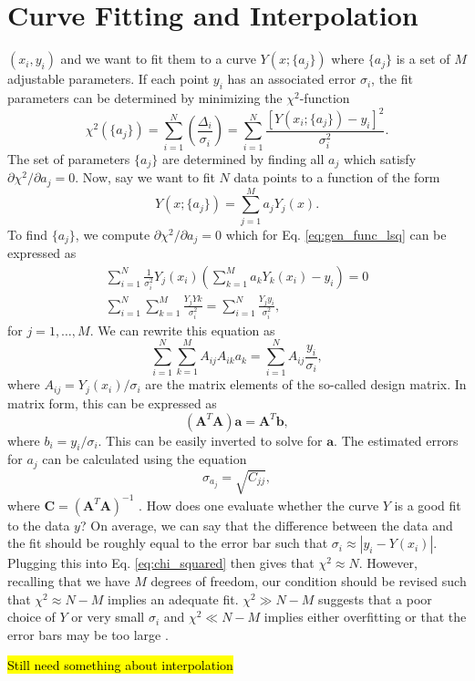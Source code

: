 \section{Curve Fitting and Interpolation}

 $(x_i,y_i)$ and we want to fit them to a curve $Y(x;\{a_j\})$ where $\{a_j\}$ is a set of $M$ adjustable parameters. If each point $y_i$ has an associated error $\sigma_i$, the fit parameters can be determined by minimizing the $\chi^2$-function
\begin{equation}
	\label{eq:chi_squared}
	\chi^2(\{a_j\})=\sum^{N}_{i=1}\left(\frac{\Delta_i}{\sigma_i}\right)= \sum^{N}_{i=1}\frac{[Y(x_i;\{a_j\}) - y_i]^2}{\sigma_i^2}.
\end{equation}
The set of parameters $\{a_j\}$ are determined by finding all $a_j$ which satisfy $\partial\chi^2/\partial a_j=0$. Now, say we want to fit $N$ data points to a function of the form
\begin{equation}
	\label{eq:gen_func_lsq}
	Y(x;\{a_j\}) = \sum_{j=1}^Ma_jY_j(x).
\end{equation}
To find $\{a_j\}$, we compute $\partial \chi^2/\partial a_j=0$ which for Eq. \ref{eq:gen_func_lsq} can be expressed as
\begin{align}
	\sum^N_{i=1}\frac{1}{\sigma_i^2}Y_j(x_i)\left(\sum_{k=1}^Ma_kY_k(x_i) - y_i\right) = 0 \\[0.5em]
	\sum^N_{i=1}\sum^M_{k=1}\frac{Y_jYk}{\sigma_i^2} = \sum^N_{i=1}\frac{Y_jy_i}{\sigma_i^2},
\end{align}
for $j=1,\ldots,M$. We can rewrite this equation as 
\begin{equation}
	\sum^N_{i=1}\sum^M_{k=1}A_{ij}A_{ik}a_k = \sum^N_{i=1}A_{ij}\frac{y_i}{\sigma_i},
\end{equation}
where $A_{ij}=Y_j(x_i)/\sigma_i$ are the matrix elements of the so-called design matrix. In matrix form, this can be expressed as 
\begin{equation}
	(\mathbf{A}^T\mathbf{A})\mathbf{a} = \mathbf{A}^T\mathbf{b},
\end{equation}
where $b_i=y_i/\sigma_i$. This can be easily inverted to solve for $\mathbf{a}$. The estimated errors for $a_j$ can be calculated using the equation
\begin{equation}
	\sigma_{a_j} = \sqrt{C_{jj}},
\end{equation}
where $\mathbf{C} = (\mathbf{A}^T\mathbf{A})^{-1}$ \cite{garcia_numerical_2000}. How does one evaluate whether the curve $Y$ is a good fit to the data $y$? On average, we can say that the difference between the data and the fit should be roughly equal to the error bar such that $\sigma_i\approx|y_i - Y(x_i)|$. Plugging this into Eq. \ref{eq:chi_squared} then gives that $\chi^2\approx N$. However, recalling that we have $M$ degrees of freedom, our condition should be revised such that $\chi^2\approx N-M$ implies an adequate fit. $\chi^2\gg N-M$ suggests that a poor choice of $Y$ or very small $\sigma_i$ and $\chi^2\ll N-M$ implies either overfitting or that the error bars may be too large \cite{garcia_numerical_2000}. 
%
\par \hl{Still need something about interpolation}

